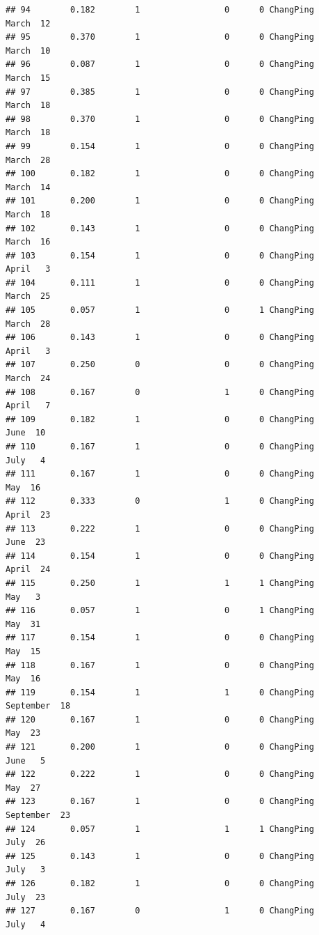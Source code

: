 \documentclass[
]{article}
\begin{document}
\begin{verbatim}
## 94        0.182        1                 0      0 ChangPing     March  12
## 95        0.370        1                 0      0 ChangPing     March  10
## 96        0.087        1                 0      0 ChangPing     March  15
## 97        0.385        1                 0      0 ChangPing     March  18
## 98        0.370        1                 0      0 ChangPing     March  18
## 99        0.154        1                 0      0 ChangPing     March  28
## 100       0.182        1                 0      0 ChangPing     March  14
## 101       0.200        1                 0      0 ChangPing     March  18
## 102       0.143        1                 0      0 ChangPing     March  16
## 103       0.154        1                 0      0 ChangPing     April   3
## 104       0.111        1                 0      0 ChangPing     March  25
## 105       0.057        1                 0      1 ChangPing     March  28
## 106       0.143        1                 0      0 ChangPing     April   3
## 107       0.250        0                 0      0 ChangPing     March  24
## 108       0.167        0                 1      0 ChangPing     April   7
## 109       0.182        1                 0      0 ChangPing      June  10
## 110       0.167        1                 0      0 ChangPing      July   4
## 111       0.167        1                 0      0 ChangPing       May  16
## 112       0.333        0                 1      0 ChangPing     April  23
## 113       0.222        1                 0      0 ChangPing      June  23
## 114       0.154        1                 0      0 ChangPing     April  24
## 115       0.250        1                 1      1 ChangPing       May   3
## 116       0.057        1                 0      1 ChangPing       May  31
## 117       0.154        1                 0      0 ChangPing       May  15
## 118       0.167        1                 0      0 ChangPing       May  16
## 119       0.154        1                 1      0 ChangPing September  18
## 120       0.167        1                 0      0 ChangPing       May  23
## 121       0.200        1                 0      0 ChangPing      June   5
## 122       0.222        1                 0      0 ChangPing       May  27
## 123       0.167        1                 0      0 ChangPing September  23
## 124       0.057        1                 1      1 ChangPing      July  26
## 125       0.143        1                 0      0 ChangPing      July   3
## 126       0.182        1                 0      0 ChangPing      July  23
## 127       0.167        0                 1      0 ChangPing      July   4

\end{verbatim}
\end{document}
